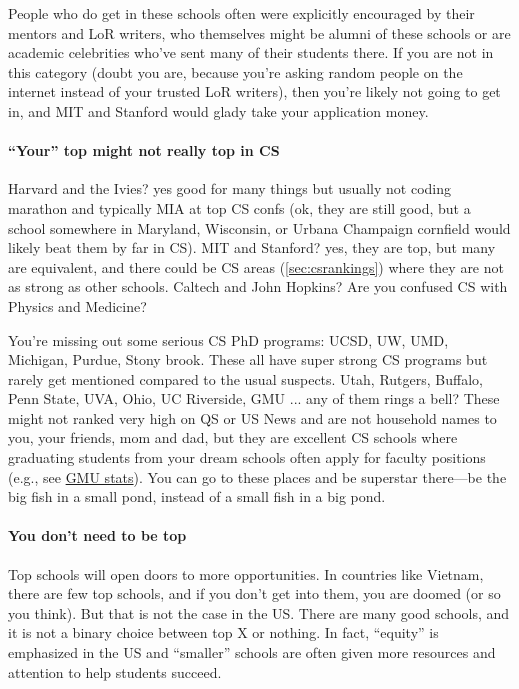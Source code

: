 \documentclass[oneside,11pt]{book}
\begin{document}
People who do get in these schools often were explicitly encouraged by their mentors and LoR writers, who themselves might be alumni of these schools or are academic celebrities who've sent many of their students there. If you are not in this category (doubt you are, because you're asking random people on the internet instead of your trusted LoR writers), then you're likely not going to get in, and MIT and Stanford would glady take your application money.

\paragraph{``Your'' top might not really top in CS} Harvard and the Ivies? yes good for many things but usually not coding marathon and typically MIA at top CS confs (ok, they are still good, but a school somewhere in Maryland, Wisconsin, or Urbana Champaign cornfield would likely beat them by far in CS). MIT and Stanford? yes, they are top, but many are equivalent, and there could be CS areas (\autoref{sec:csrankings}) where they are not as strong as other schools.  Caltech and John Hopkins? Are you confused CS with Physics and Medicine?

You're missing out some serious CS PhD programs: UCSD, UW, UMD, Michigan, Purdue, Stony brook. These all have super strong CS programs but rarely get mentioned compared to the usual suspects. Utah, Rutgers, Buffalo, Penn State, UVA, Ohio, UC Riverside, GMU ... any of them rings a bell? These might not ranked very high on QS or US News and are not household names to you, your friends, mom and dad, but they are excellent CS schools where graduating students from your dream schools often apply for faculty positions (e.g., see \href{https://github.com/dynaroars/dynaroars.github.io/wiki/About-GMU}{GMU stats}). You can go to these places and be superstar there---be the big fish in a small pond, instead of a small fish in a big pond.

\paragraph{You don't need to be top}  Top schools will open doors to more opportunities. In countries like Vietnam, there are few top schools, and if you don't get into them, you are doomed  (or so you think). But that is not the case in the US. There are many good schools, and it is not a binary choice between top X or nothing.  In fact, ``equity'' is emphasized in the US and ``smaller'' schools are often given more resources and attention to help students succeed.  
\end{document}

